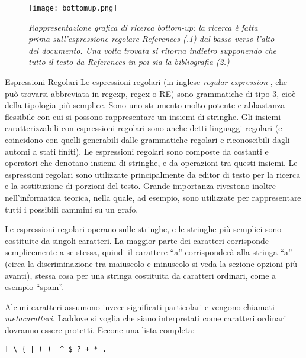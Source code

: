 \begin{figure}[htb]
\begin{center}
\texttt{[image: bottomup.png]}
\end{center}
\caption[Rappresentazione grafica di ricerca bottom-up]{\textit{Rappresentazione grafica di ricerca bottom-up: la ricerca è fatta prima sull'espressione regolare References (.1) dal basso verso l'alto del documento. Una volta trovata si ritorna indietro supponendo che tutto il testo da References in poi sia la bibliografia (2.)} }
\label{fig:bottomup}
\end{figure}

\begin{subsubsection}{Espressioni Regolari}
 Le espressioni regolari (in inglese \textit{regular expression} \cite{regexp}, che può trovarsi abbreviata in regexp, regex o RE) sono grammatiche di tipo 3, cioè della tipologia più semplice. Sono uno strumento molto potente e abbastanza flessibile con cui si possono rappresentare un insiemi di stringhe. Gli insiemi caratterizzabili con espressioni regolari sono anche detti linguaggi regolari (e coincidono con quelli generabili dalle grammatiche regolari e riconoscibili dagli automi a stati finiti). Le espressioni regolari sono composte da costanti e operatori che denotano insiemi di stringhe, e da operazioni tra questi insiemi. Le espressioni regolari sono utilizzate principalmente da editor di testo per la ricerca e la sostituzione di porzioni del testo. Grande importanza rivestono inoltre nell'informatica teorica, nella quale, ad esempio, sono utilizzate per rappresentare tutti i possibili cammini su un grafo.

Le espressioni regolari operano sulle stringhe, e le stringhe più semplici sono costituite da singoli caratteri. La maggior parte dei caratteri corrisponde semplicemente a se stessa, quindi il carattere ``a'' corrisponderà alla stringa ``a'' (circa la discriminazione tra maiuscolo e minuscolo si veda la sezione opzioni più avanti), stessa cosa per una stringa costituita da caratteri ordinari, come a esempio ``spam''.

Alcuni caratteri assumono invece significati particolari e vengono chiamati \textit{metacaratteri}. Laddove si voglia che siano interpretati come caratteri ordinari dovranno essere protetti. Eccone una lista completa:

\begin{verbatim}
[ \ { | ( )  ^ $ ? + * .
\end{verbatim}


\end{subsubsection}

